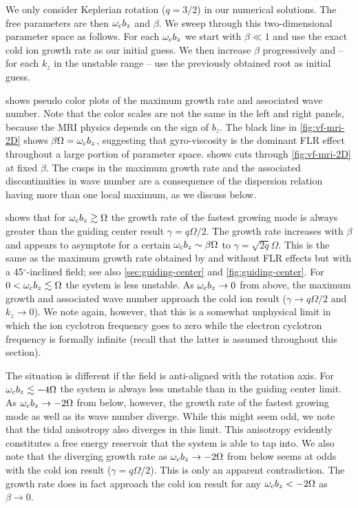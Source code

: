 \documentclass[aps,pre,notitlepage,amsmath,amssymb,amsfonts,nobibnotes,nofootinbib]{revtex4-1}
\begin{document}
We only consider Keplerian rotation ($q=3/2$) in our numerical solutions. The
free parameters are then $\omega_c{}b_z$ and $\beta$. We sweep through this
two-dimensional parameter space as follows. For each $\omega_c{}b_z$ we start with
$\beta\ll1$ and use the exact cold ion growth rate as our initial guess. We
then increase $\beta$ progressively and -- for each $k_z$ in the unstable
range -- use the previously obtained root as initial guess.

 shows pseudo color plots of the maximum growth rate and
associated wave number. Note that the color scales are not the same in the
left and right panels, because the MRI physics depends on the sign of $b_z$.
The black line in \cref{fig:vf-mri-2D} shows $\beta\Omega=\omega_c{}b_z$,
suggesting that gyro-viscosity is the dominant FLR effect throughout a large
portion of parameter space.  shows cuts through
\cref{fig:vf-mri-2D} at fixed $\beta$. The cusps in the maximum growth rate
and the associated discontinuities in wave number are a consequence of the
dispersion relation having more than one local maximum, as we discuss below.

 shows that for $\omega_c{}b_z\gtrsim\Omega$ the growth rate of
the fastest growing mode is always greater than the guiding center result
$\gamma=q\Omega/2$. The growth rate increases with $\beta$ and appears to
asymptote for a certain $\omega_c{}b_z\sim\beta\Omega$ to
$\gamma=\sqrt{2q}\Omega$. This is the same as the maximum growth rate obtained
by \citet{Quataert2002} and \citet{Balbus2004} without FLR effects but with a
45$^\circ$-inclined field; see also \cref{sec:guiding-center} and
\cref{fig:guiding-center}. For $0<\omega_c{}b_z\lesssim\Omega$ the system is less
unstable. As $\omega_c{}b_z\to0$ from above, the maximum growth and associated
wave number approach the cold ion result ($\gamma\to{}q\Omega/2$ and
$k_z\to0$). We note again, however, that this is a somewhat unphysical limit
in which the ion cyclotron frequency goes to zero while the electron cyclotron
frequency is formally infinite (recall that the latter is assumed throughout
this section).

The situation is different if the field is anti-aligned with the rotation
axis. For $\omega_c{}b_z\lesssim-4\Omega$ the system is always less unstable than
in the guiding center limit. As $\omega_c{}b_z\to-2\Omega$ from below, however,
the growth rate of the fastest growing mode as well as its wave number
diverge. While this might seem odd, we note that the tidal anisotropy also
diverges in this limit. This anisotropy evidently constitutes a free energy
reservoir that the system is able to tap into. We also note that the diverging
growth rate as $\omega_c{}b_z\to-2\Omega$ from below seems at odds with the cold
ion result ($\gamma=q\Omega/2$). This is only an apparent contradiction. The
growth rate does in fact approach the cold ion result for any
$\omega_c{}b_z<-2\Omega$ as $\beta\to0$.
\end{document}
